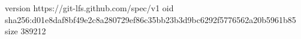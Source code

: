 version https://git-lfs.github.com/spec/v1
oid sha256:d01e8daf8bf49e2c8a280729ef86c35bb23b3d9bc6292f5776562a20b5961b85
size 389212
